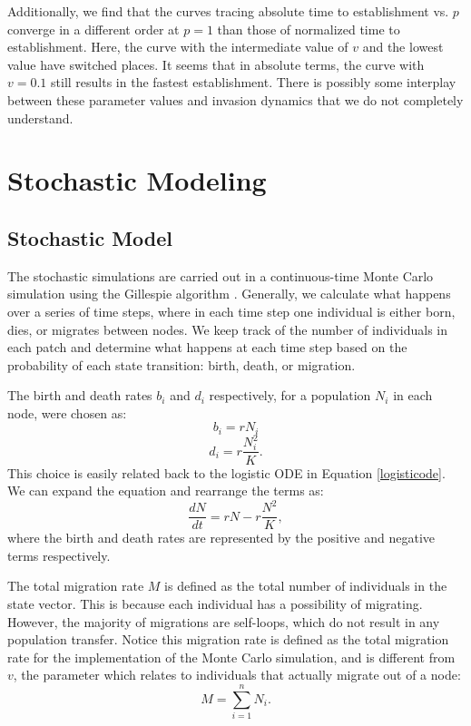 \documentclass[12pt, openany]{book}
\theoremstyle{definition}
\theoremstyle{remark}
\numberwithin{equation}{chapter}
\numberwithin{figure}{chapter}
\begin{document}
Additionally, we find that the curves tracing absolute time to establishment vs. $p$ converge in a different order at $p = 1$ than those of normalized time to establishment. Here, the curve with the intermediate value of $v$ and the lowest value have switched places. It seems that in absolute terms, the curve with $v = 0.1$ still results in the fastest establishment. There is possibly some interplay between these parameter values and invasion dynamics that we do not completely understand.

\chapter{Stochastic Modeling}

\section{Stochastic Model}
The stochastic simulations are carried out in a continuous-time Monte Carlo simulation using the Gillespie algorithm \citep{gillespie1977exact}. Generally, we calculate what happens over a series of time steps, where in each time step one individual is either born, dies, or migrates between nodes. We keep track of the number of individuals in each patch and determine what happens at each time step based on the probability of each state transition: birth, death, or migration. 

The birth and death rates $b_i$ and $d_i$ respectively, for a population $N_i$ in each node, were chosen as:
\begin{equation}\label{birth}
b_i = rN_i
\end{equation}
\begin{equation}\label{death}
d_i = r\frac{N_i^2}{K}.
\end{equation}
This choice is easily related back to the logistic ODE in Equation \ref{logisticode}. We can expand the equation and rearrange the terms as:
\begin{equation}\label{bdode}
\frac{dN}{dt} = rN - r\frac{N^2}{K},
\end{equation}
where the birth and death rates are represented by the positive and negative terms respectively.

The total migration rate $M$ is defined as the total number of individuals in the state vector. This is because each individual has a possibility of migrating. However, the majority of migrations are self-loops, which do not result in any population transfer. Notice this migration rate is defined as the total migration rate for the implementation of the Monte Carlo simulation, and is different from $v$, the parameter which relates to individuals that actually migrate out of a node:
\begin{equation}\label{stochmigrationrate}
M = \sum_{i = 1}^{n}N_i.
\end{equation}
\end{document}
